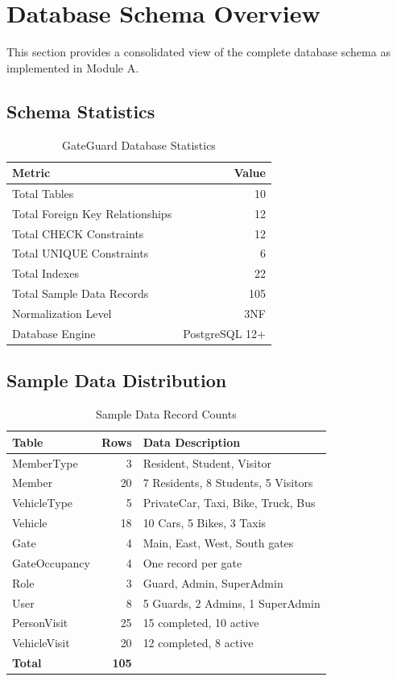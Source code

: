 \documentclass[a4paper, 12pt]{article}
\begin{document}
\section{Database Schema Overview}
\label{sec:schema}

This section provides a consolidated view of the complete database schema as implemented in Module A.

\subsection{Schema Statistics}

\begin{table}[H]
\centering
\caption{GateGuard Database Statistics}
\label{tab:stats}
\begin{tabularx}{\textwidth}{l r}
\toprule
\textbf{Metric} & \textbf{Value} \\
\midrule
Total Tables & 10 \\
Total Foreign Key Relationships & 12 \\
Total CHECK Constraints & 12 \\
Total UNIQUE Constraints & 6 \\
Total Indexes & 22 \\
Total Sample Data Records & 105 \\
Normalization Level & 3NF \\
Database Engine & PostgreSQL 12+ \\
\bottomrule
\end{tabularx}
\end{table}

\subsection{Sample Data Distribution}

\begin{table}[H]
\centering
\caption{Sample Data Record Counts}
\label{tab:data-dist}
\begin{tabularx}{\textwidth}{l r X}
\toprule
\textbf{Table} & \textbf{Rows} & \textbf{Data Description} \\
\midrule
MemberType & 3 & Resident, Student, Visitor \\
Member & 20 & 7 Residents, 8 Students, 5 Visitors \\
VehicleType & 5 & PrivateCar, Taxi, Bike, Truck, Bus \\
Vehicle & 18 & 10 Cars, 5 Bikes, 3 Taxis \\
Gate & 4 & Main, East, West, South gates \\
GateOccupancy & 4 & One record per gate \\
Role & 3 & Guard, Admin, SuperAdmin \\
User & 8 & 5 Guards, 2 Admins, 1 SuperAdmin \\
PersonVisit & 25 & 15 completed, 10 active \\
VehicleVisit & 20 & 12 completed, 8 active \\
\midrule
\textbf{Total} & \textbf{105} & \\
\bottomrule
\end{tabularx}
\end{table}
\end{document}
